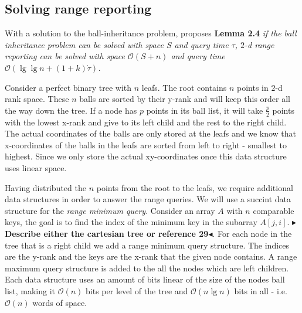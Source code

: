 \documentclass[twoside,11pt,openright]{report}
\newcommand{\todo}[1]{{\color[rgb]{.5,0,0}\textbf{$\blacktriangleright$#1$\blacktriangleleft$}}}
\begin{document}
\noindent \todo{Improvements}

\subsection{Solving range reporting}
With a solution to the ball-inheritance problem, \citet{chanetal} proposes \textbf{Lemma 2.4} \emph{if the ball inheritance problem can be solved with space $S$ and query time $\tau$, $2$-d range reporting can be solved with space $\mathcal{O}(S+n)$ and query time $\mathcal{O}(\lg \lg n + (1+k) \dot \tau)$.}

Consider a perfect binary tree with $n$ leafs. The root contains $n$ points in $2$-d rank space. These $n$ balls are sorted by their y-rank and will keep this order all the way down the tree. If a node has $p$ points in its ball list, it will take $\frac{p}{2}$ points with the lowest x-rank and give to its left child and the rest to the right child. The actual coordinates of the balls are only stored at the leafs and we know that x-coordinates of the balls in the leafs are sorted from left to right - smallest to highest. Since we only store the actual xy-coordinates once this data structure uses linear space.

Having distributed the $n$ points from the root to the leafs, we require additional data structures in order to answer the range queries. We will use a succint data structure for the \emph{range minimum query}. Consider an array $A$ with $n$ comparable keys, the goal is to find the index of the minimum key in the subarray $A[j,i]$. \todo{Describe either the cartesian tree or reference 29}. For each node in the tree that is a right child we add a range minimum query structure. The indices are the y-rank and the keys are the x-rank that the given node contains. A range maximum query structure is added to the all the nodes which are left children. Each data structure uses an amount of bits linear of the size of the nodes ball list, making it $\mathcal{O}(n)$ bits per level of the tree and $\mathcal{O}(n \lg n)$ bits in all - i.e. $\mathcal{O}(n)$ words of space.
\end{document}
